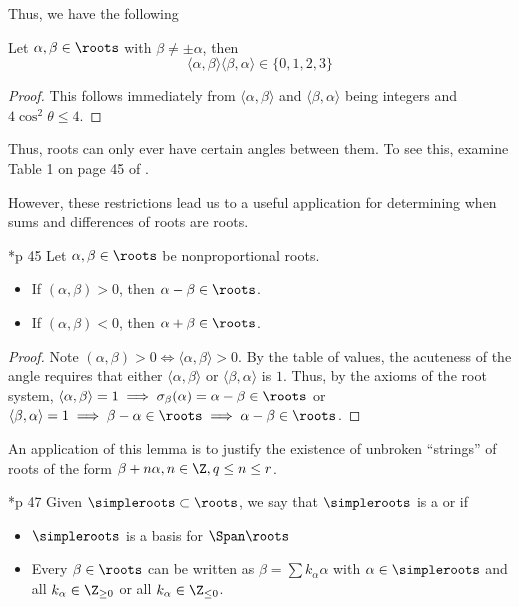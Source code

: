 \documentclass[11pt,leqno,oneside]{amsart}
\numberwithin{thm}{section}
\begin{document}
Thus, we have the following
\begin{lem}\label{possible-values-of-inner-product}
  Let \(\alpha,\beta \in \roots\) with \(\beta \neq \pm \alpha\),
  then \[ 
    \langle \alpha,\beta \rangle \langle \beta,\alpha \rangle \in \{0,1,2,3\}
  \]
\end{lem}
\begin{proof}
  This follows immediately from \(\langle \alpha,\beta \rangle\) and
  \(\langle \beta,\alpha \rangle\) being integers and \(4 \cos^2
  \theta \leq 4\).
\end{proof}
Thus, roots can only ever have certain angles
between them. To see this, examine Table 1 on page 45 of
\cite{humph}. 

However, these restrictions lead us to a useful
application for determining when sums and differences of roots are
roots.
\begin{lem}
  \cite{humph}*{p 45} Let $\alpha,\beta \in \roots$ be nonproportional
  roots.
  \begin{itemize}
  \item If $(\alpha,\beta) > 0$, then $\alpha-\beta \in \roots$.
  \item If $(\alpha,\beta) < 0$, then $\alpha+\beta \in \roots$.
  \end{itemize}
\end{lem}
\begin{proof}
  Note \((\alpha,\beta) > 0 \iff \langle \alpha,\beta \rangle >
  0\). By the table of values, the acuteness of the angle requires
  that either \(\langle \alpha,\beta \rangle\) or \(\langle
  \beta,\alpha \rangle\) is \(1\). Thus, by the axioms of the root
  system, \(\langle \alpha,\beta \rangle = 1 \implies
  \sigma_\beta(\alpha) = \alpha-\beta \in \roots\) or \(\langle
  \beta,\alpha \rangle = 1 \implies \beta-\alpha \in \roots \implies
  \alpha-\beta \in \roots\).
\end{proof}
An application of this lemma is to justify the existence of
unbroken ``strings'' of roots of the form $\beta + n \alpha, n \in \Z,
q \leq n \leq r$. 
\begin{defn}
  \cite{humph}*{p 47} Given $\simpleroots \subset \roots$, we say that $\simpleroots$ is a  or  if
  \begin{itemize}
  \item $\simpleroots$ is a basis for $\Span \roots$
  \item Every $\beta \in \roots$ can be written as $\beta = \sum
    k_\alpha \alpha$ with $\alpha \in \simpleroots$ and all $k_\alpha \in
    \Z_{\geq 0}$ or all $k_\alpha \in \Z_{\leq 0}$.
  \end{itemize}
\end{defn}
\end{document}
